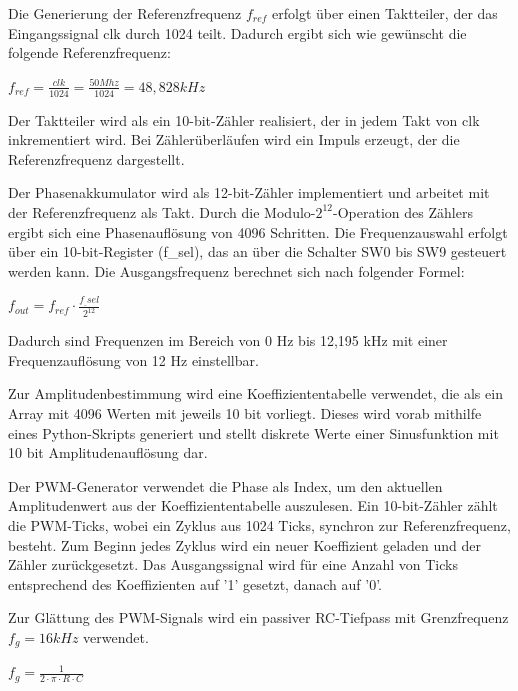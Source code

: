 \noindent Die Generierung der Referenzfrequenz $f_{ref}$ erfolgt über einen Taktteiler, der das Eingangssignal clk durch 1024 teilt.
Dadurch ergibt sich wie gewünscht die folgende Referenzfrequenz:

\begin{math}
    f_{ref} = \frac{clk}{1024} = \frac{50 Mhz}{1024} = 48,828 kHz
\end{math} 

\noindent Der Taktteiler wird als ein 10-bit-Zähler realisiert, der in jedem Takt von clk inkrementiert wird.
Bei Zählerüberläufen wird ein Impuls erzeugt, der die Referenzfrequenz dargestellt.

\noindent Der Phasenakkumulator wird als 12-bit-Zähler implementiert und arbeitet mit der Referenzfrequenz als Takt.
Durch die Modulo-$2^{12}$-Operation des Zählers ergibt sich eine Phasenauflösung von 4096 Schritten.
Die Frequenzauswahl erfolgt über ein 10-bit-Register (f\_sel), das an über die Schalter SW0 bis SW9 gesteuert werden kann.
Die Ausgangsfrequenz berechnet sich nach folgender Formel:

\begin{math}
    f_{out} = f_{ref} \cdot \frac{f_\_sel}{2^{12}}
\end{math}

\noindent Dadurch sind Frequenzen im Bereich von 0 Hz bis 12,195 kHz mit einer Frequenzauflösung von 12 Hz einstellbar. 

\noindent Zur Amplitudenbestimmung wird eine Koeffiziententabelle verwendet, die als ein Array mit 4096 Werten mit jeweils 10 bit vorliegt.
Dieses wird vorab mithilfe eines Python-Skripts generiert und stellt diskrete Werte einer Sinusfunktion mit 10 bit Amplitudenauflösung dar.

\noindent Der PWM-Generator verwendet die Phase als Index, um den aktuellen Amplitudenwert aus der Koeffiziententabelle auszulesen.
Ein 10-bit-Zähler zählt die PWM-Ticks, wobei ein Zyklus aus 1024 Ticks, synchron zur Referenzfrequenz, besteht.
Zum Beginn jedes Zyklus wird ein neuer Koeffizient geladen und der Zähler zurückgesetzt.
Das Ausgangssignal wird für eine Anzahl von Ticks entsprechend des Koeffizienten auf '1' gesetzt, danach auf '0'.

\noindent Zur Glättung des PWM-Signals wird ein passiver RC-Tiefpass mit Grenzfrequenz $f_g = 16 kHz$ verwendet.

\begin{math}
    f_g=\frac{1}{2 \cdot \pi \cdot R \cdot C}
\end{math}

